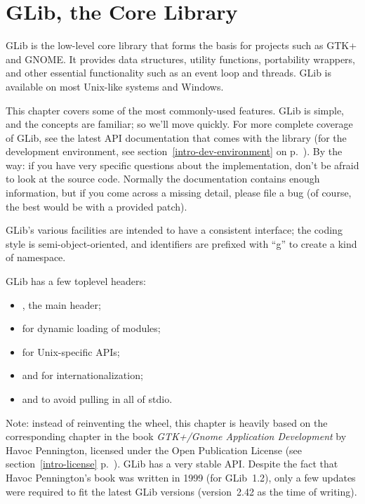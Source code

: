 \chapter{GLib, the Core Library}
\label{glib}

GLib is the low-level core library that forms the basis for projects such as GTK+ and GNOME. It provides data structures, utility functions, portability wrappers, and other essential functionality such as an event loop and threads. GLib is available on most Unix-like systems and Windows.

This chapter covers some of the most commonly-used features. GLib is simple, and the concepts are familiar; so we'll move quickly. For more complete coverage of GLib, see the latest API documentation that comes with the library (for the development environment, see section~\ref{intro-dev-environment} on p.~\pageref{intro-dev-environment}). By the way: if you have very specific questions about the implementation, don't be afraid to look at the source code. Normally the documentation contains enough information, but if you come across a missing detail, please file a bug (of course, the best would be with a provided patch).

GLib's various facilities are intended to have a consistent interface; the coding style is semi-object-oriented, and identifiers are prefixed with ``g'' to create a kind of namespace.

GLib has a few toplevel headers:
\begin{itemize}
  \item {}, the main header;
  \item {} for dynamic loading of modules;
  \item {} for Unix-specific APIs;
  \item {} and  for internationalization;
  \item {} and  to avoid pulling in all of stdio.
\end{itemize}

\bigskip
Note: instead of reinventing the wheel, this chapter is heavily based on the corresponding chapter in the book \emph{GTK+/Gnome Application Development} by Havoc Pennington, licensed under the Open Publication License (see section~\ref{intro-license} p.~\pageref{intro-license}). GLib has a very stable API. Despite the fact that Havoc Pennington's book was written in 1999 (for GLib~1.2), only a few updates were required to fit the latest GLib versions (version~2.42 as the time of writing).

